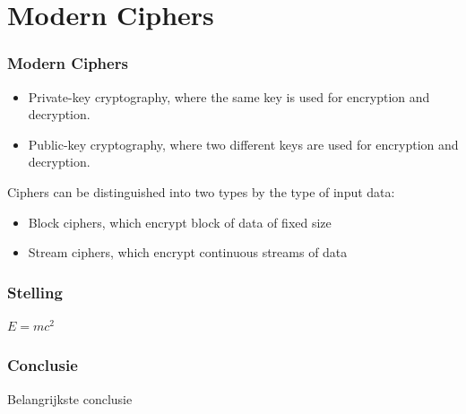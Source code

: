 \documentclass{uva-inf-presentation}
\begin{document}
\section{Modern Ciphers}
\begin{frame}
\frametitle{Modern Ciphers}

\begin{itemize}
    \item Private-key cryptography, where the same key is used for encryption
        and decryption.
    \item Public-key cryptography, where two different keys are used for
        encryption and decryption.
\end{itemize}
Ciphers can be distinguished into two types by the type of input data:
\begin{itemize}
    \item Block ciphers, which encrypt block of data of fixed size
    \item Stream ciphers, which encrypt continuous streams of data
\end{itemize}
\end{frame}
\begin{frame}
\frametitle{Stelling}
\begin{theorem}
$E = mc^2$
\end{theorem}
\end{frame}
\begin{frame}
\frametitle{Conclusie}
\Large{\centerline{Belangrijkste conclusie}}
\end{frame}
\end{document}
